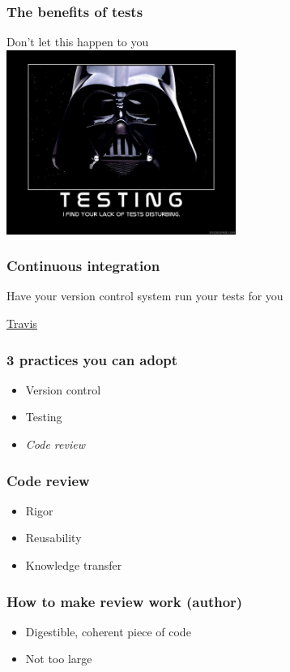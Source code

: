 \documentclass{beamer}
\begin{document}
\begin{frame}
\frametitle{The benefits of tests}
Don't let this happen to you
\\
\includegraphics[height=6cm]{figures/lack_of_tests.jpg}
\end{frame}

\begin{frame}
\frametitle{Continuous integration}
Have your version control system run your tests for you

\href{https://travis-ci.org}{Travis}

\end{frame}

\begin{frame}
\frametitle{3 practices you can adopt}
\begin{itemize}
\item
Version control
\item
Testing
\item
\emph{Code review}
\end{itemize}
\end{frame}


\begin{frame}
\frametitle{Code review}
\begin{itemize}
\pause
\item
Rigor
\pause
\item
Reusability
\pause
\item
Knowledge transfer
\end{itemize}
\end{frame}

\begin{frame}
\frametitle{How to make review work (author)}
\begin{itemize}
\pause
\item 
 Digestible, coherent piece of code
\pause
\item
Not too large
\end{itemize}
\end{frame}
\end{document}
